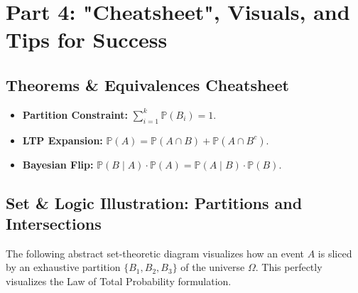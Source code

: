 \documentclass[12pt]{article}
\begin{document}
\newpage
\section{Part 4: "Cheatsheet", Visuals, and Tips for Success}

\subsection{Theorems \& Equivalences Cheatsheet}
\begin{itemize}
    \item \textbf{Partition Constraint:} $\sum_{i=1}^k \mathbb{P}(B_i) = 1$.
    \item \textbf{LTP Expansion:} $\mathbb{P}(A) = \mathbb{P}(A \cap B) + \mathbb{P}(A \cap B^c)$.
    \item \textbf{Bayesian Flip:} $\mathbb{P}(B \mid A) \cdot \mathbb{P}(A) = \mathbb{P}(A \mid B) \cdot \mathbb{P}(B)$.
\end{itemize}

\subsection{Set \& Logic Illustration: Partitions and Intersections}
The following abstract set-theoretic diagram visualizes how an event $A$ is sliced by an exhaustive partition $\{B_1, B_2, B_3\}$ of the universe $\Omega$. This perfectly visualizes the Law of Total Probability formulation.

\begin{center}
\end{center}
\end{document}
